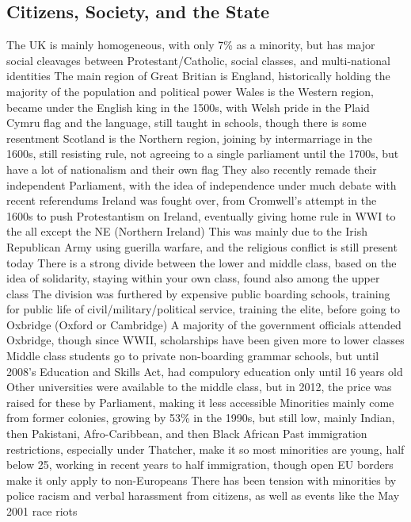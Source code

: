 \documentclass[11 pt, twoside]{article}
\newenvironment{outline*}
{
	\begin{outline}[enumerate]
	}
	{\end{outline}
}
\begin{document}
\subsection{Citizens, Society, and the State}
\begin{outline*}
\1 The UK is mainly homogeneous, with only 7\% as a minority, but has major social cleavages between Protestant/Catholic, social classes, and multi-national identities
\2 The main region of Great Britian is England, historically holding the majority of the population and political power
\2 Wales is the Western region, became under the English king in the 1500s, with Welsh pride in the Plaid Cymru flag and the language, still taught in schools, though there is some resentment
\2 Scotland is the Northern region, joining by intermarriage in the 1600s, still resisting rule, not agreeing to a single parliament until the 1700s, but have a lot of nationalism and their own flag
\3 They also recently remade their independent Parliament, with the idea of independence under much debate with recent referendums
\2 Ireland was fought over, from Cromwell's attempt in the 1600s to push Protestantism on Ireland, eventually giving home rule in WWI to the all except the NE (Northern Ireland)
\3 This was mainly due to the Irish Republican Army using guerilla warfare, and the religious conflict is still present today
\1 There is a strong divide between the lower and middle class, based on the idea of solidarity, staying within your own class, found also among the upper class
\2 The division was furthered by expensive public boarding schools, training for public life of civil/military/political service, training the elite, before going to Oxbridge (Oxford or Cambridge)
\3 A majority of the government officials attended Oxbridge, though since WWII, scholarships have been given more to lower classes
\2 Middle class students go to private non-boarding grammar schools, but until 2008's Education and Skills Act, had compulory education only until 16 years old
\3 Other universities were available to the middle class, but in 2012, the price was raised for these by Parliament, making it less accessible
\1 Minorities mainly come from former colonies, growing by 53\% in the 1990s, but still low, mainly Indian, then Pakistani, Afro-Caribbean, and then Black African
\2 Past immigration restrictions, especially under Thatcher, make it so most minorities are young, half below 25, working in recent years to half immigration, though open EU borders make it only apply to non-Europeans
\2 There has been tension with minorities by police racism and verbal harassment from citizens, as well as events like the May 2001 race riots

\end{outline*}
\end{document}
